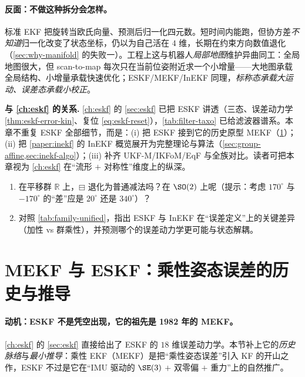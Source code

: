 \paragraph{反面：不做这种拆分会怎样。}
标准 EKF 把旋转当欧氏向量、预测后归一化四元数。短时间内能跑，但协方差\emph{不知道}归一化改变了状态坐标，仍以为自己活在 $4$ 维，长期在约束方向数值退化（\cref{sec:why-manifold} 的失败一）。工程上这与机器人\emph{局部地图}维护异曲同工：全局地图很大，但 scan-to-map 每次只在当前位姿附近求一个小增量——大地图承载全局结构、小增量承载快速优化；ESKF/MEKF/InEKF 同理，\emph{标称态承载大运动、误差态承载小校正}。

\begin{note}
\textbf{与 \cref{ch:eskf} 的关系.}\;
\cref{ch:eskf} 的 \cref{sec:eskf} 已把 ESKF 讲透（三态、误差动力学 \cref{thm:eskf-error-kin}、复位 \cref{eq:eskf-reset}），\cref{tab:filter-taxo} 已给滤波器谱系。本章不重复 ESKF 全部细节，而是：(i) 把 ESKF 接到它的历史原型 MEKF（\cref{sec:mekf-eskf}）；(ii) 把 \cref{paper:inekf} 的 InEKF 概览展开为完整理论与算法（\cref{sec:group-affine,sec:inekf-algo}）；(iii) 补齐 UKF-M/IKFoM/EqF 与全族对比。读者可把本章视为 \cref{ch:eskf} 在“流形 $+$ 对称性”维度上的纵深。
\end{note}

\begin{practice}
\begin{enumerate}
  \item 在平移群 $\mathbb{R}$ 上，$\boxminus$ 退化为普通减法吗？在 $\SO(2)$ 上呢（提示：考虑 $170^\circ$ 与 $-170^\circ$ 的“差”应是 $20^\circ$ 还是 $340^\circ$）？
  \item 对照 \cref{tab:family-unified}，指出 ESKF 与 InEKF 在“误差定义”上的关键差异（加性 vs 群乘性），并预测哪个的误差动力学更可能与状态解耦。
\end{enumerate}
\end{practice}

\section{MEKF 与 ESKF：乘性姿态误差的历史与推导}
\label{sec:mekf-eskf}

\paragraph{动机：ESKF 不是凭空出现，它的祖先是 1982 年的 MEKF。}
\cref{ch:eskf} 的 \cref{sec:eskf} 直接给出了 ESKF 的 $18$ 维误差动力学。本节补上它的\emph{历史脉络}与\emph{最小推导}：乘性 EKF（MEKF）是把“乘性姿态误差”引入 KF 的开山之作，ESKF 不过是它在“IMU 驱动的 $\SE(3)$ $+$ 双零偏 $+$ 重力”上的自然推广。

